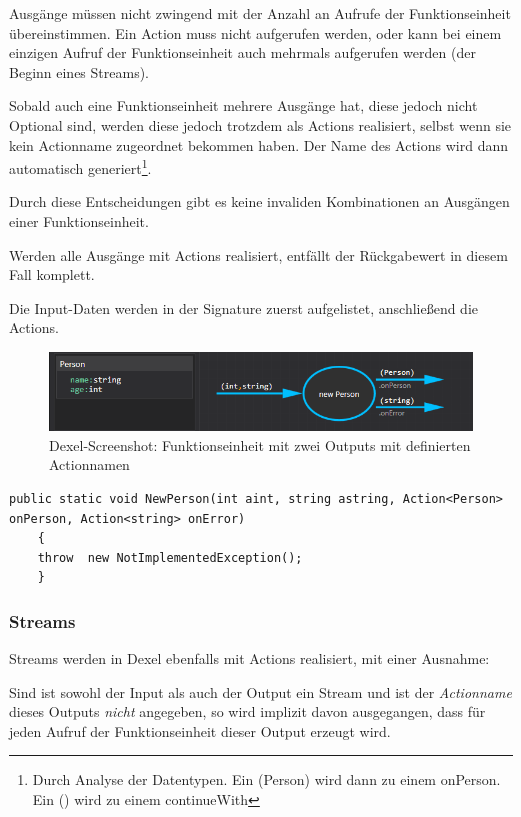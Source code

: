 	Ausgänge müssen nicht zwingend mit
	der Anzahl an Aufrufe der Funktionseinheit übereinstimmen. Ein Action muss
	nicht aufgerufen werden, oder kann bei einem einzigen Aufruf der Funktionseinheit auch
	mehrmals aufgerufen werden (der Beginn eines Streams). 
	
	Sobald auch eine Funktionseinheit mehrere Ausgänge hat, diese jedoch nicht
	Optional sind, werden diese jedoch trotzdem als Actions realisiert, selbst wenn sie kein
	Actionname zugeordnet bekommen haben. Der Name des Actions wird dann
	automatisch generiert\footnote{	Durch Analyse der Datentypen. Ein
	(Person) wird dann zu einem onPerson. Ein () wird zu einem continueWith}.
	
	Durch diese Entscheidungen gibt es keine invaliden Kombinationen an
	Ausgängen einer Funktionseinheit.
	
	
	Werden alle Ausgänge mit Actions realisiert, entfällt der Rückgabewert in diesem Fall komplett.
	
	Die Input-Daten werden in der Signature zuerst aufgelistet, anschließend die Actions.
	
			\begin{figure}[H]
				\centering
				\includegraphics[width=\linewidth]{./img/roslyn_multipleOutputs.png} 
				\caption{Dexel-Screenshot: Funktionseinheit mit zwei Outputs mit definierten Actionnamen}
			\end{figure}
			
	

	
	\begin{lstlisting}[caption=Mit Dexel generierter Code ]
	public static void NewPerson(int aint, string astring, Action<Person> onPerson, Action<string> onError)
	{
	throw  new NotImplementedException();
	}
	\end{lstlisting}
	 \subsubsection{Streams}

	Streams werden in Dexel ebenfalls mit Actions realisiert, mit einer Ausnahme:
	
	Sind ist sowohl der Input als auch der Output ein Stream und ist der \textit{Actionname} dieses Outputs \textit{nicht} angegeben, so wird  implizit davon ausgegangen, dass für jeden Aufruf der Funktionseinheit dieser Output erzeugt wird. 
	
